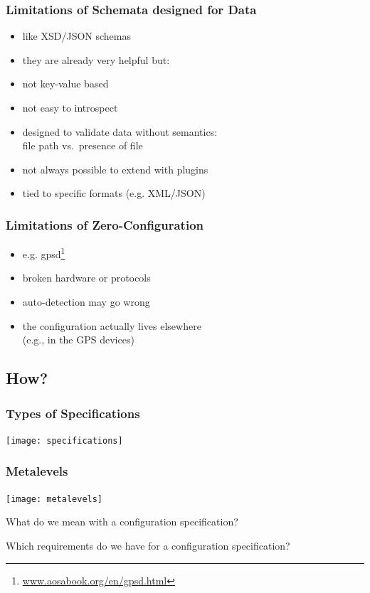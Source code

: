 \begin{frame}
	\frametitle{Limitations of Schemata designed for Data}
	\begin{itemize}
	\item like XSD/JSON schemas
	\item they are already very helpful but:
	\pause
	\item not key-value based
	\item not easy to introspect
	\item designed to validate data without semantics: \\ file path vs.\ presence of file
	\item not always possible to extend with plugins
	\item tied to specific formats (e.g. XML/JSON)
	\end{itemize}
\end{frame}

\begin{frame}
	\frametitle{Limitations of Zero-Configuration}
	\begin{itemize}
	\item e.g. gpsd\footnote{\url{www.aosabook.org/en/gpsd.html}}
	\pause
	\item broken hardware or protocols
	\item auto-detection may go wrong
	\item the configuration actually lives elsewhere \\ (e.g., in the GPS devices)
	\end{itemize}
\end{frame}

\subsection{How?}

\begin{frame}
	\frametitle{Types of Specifications}
	\texttt{[image: specifications]}
\end{frame}

\begin{frame}
	\frametitle{Metalevels}
	\texttt{[image: metalevels]}
\end{frame}

\begin{assignment}
	\begin{task}
	What do we mean with a configuration specification?
	\end{task}

	\begin{task}
	Which requirements do we have for a configuration specification?
	\end{task}
\end{assignment}


